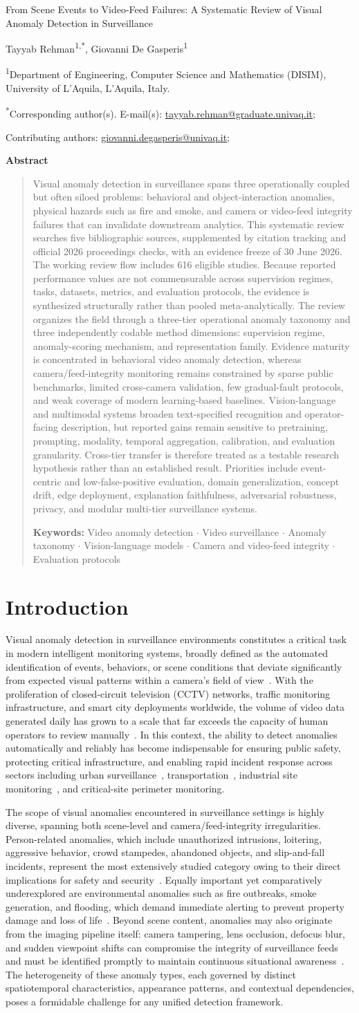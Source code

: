 \documentclass[10pt,a4paper]{article}
\makeatletter
\newif\ifprovisionalnumbers
\newcommand{\pnum}[1]{\ifprovisionalnumbers\textcolor{orange!75!black}{\textbf{#1}}\else #1\fi}
\newcommand{\articletitle}{From Scene Events to Video-Feed Failures: A Systematic Review of Visual Anomaly Detection in Surveillance}
\newcommand{\makemanuscripttitle}{%
  \thispagestyle{empty}%
  \begingroup
  \setlength{\parindent}{0pt}%
  \vspace*{0.74in}
  \begin{center}
    {\fontsize{17.28}{20.74}\selectfont \articletitle\par}
    \vspace{0.28in}
    {\fontsize{9}{11}\selectfont Tayyab Rehman\textsuperscript{1,*}, Giovanni De Gasperis\textsuperscript{1}\par}
    \vspace{0.06in}
    {\fontsize{8}{9.5}\selectfont
    \textsuperscript{1}Department of Engineering, Computer Science and Mathematics (DISIM), University of L'Aquila, L'Aquila, Italy.\par}
    \vspace{0.10in}
    {\fontsize{8}{9.5}\selectfont\textsuperscript{*}Corresponding author(s). E-mail(s): \href{mailto:tayyab.rehman@graduate.univaq.it}{tayyab.rehman@graduate.univaq.it};\par
    Contributing authors: \href{mailto:giovanni.degasperis@univaq.it}{giovanni.degasperis@univaq.it};\par}
    \vspace{0.20in}
    {\fontsize{8}{9}\selectfont\bfseries Abstract\par}
  \end{center}
  \begin{quote}\fontsize{8}{9.6}\selectfont
Visual anomaly detection in surveillance spans three operationally coupled but often siloed problems: behavioral and object-interaction anomalies, physical hazards such as fire and smoke, and camera or video-feed integrity failures that can invalidate downstream analytics. This systematic review searches five bibliographic sources, supplemented by citation tracking and official 2026 proceedings checks, with an evidence freeze of 30 June 2026. The working review flow includes \pnum{616} eligible studies. Because reported performance values are not commensurable across supervision regimes, tasks, datasets, metrics, and evaluation protocols, the evidence is synthesized structurally rather than pooled meta-analytically. The review organizes the field through a three-tier operational anomaly taxonomy and three independently codable method dimensions: supervision regime, anomaly-scoring mechanism, and representation family. Evidence maturity is concentrated in behavioral video anomaly detection, whereas camera/feed-integrity monitoring remains constrained by sparse public benchmarks, limited cross-camera validation, few gradual-fault protocols, and weak coverage of modern learning-based baselines. Vision-language and multimodal systems broaden text-specified recognition and operator-facing description, but reported gains remain sensitive to pretraining, prompting, modality, temporal aggregation, calibration, and evaluation granularity. Cross-tier transfer is therefore treated as a testable research hypothesis rather than an established result. Priorities include event-centric and low-false-positive evaluation, domain generalization, concept drift, edge deployment, explanation faithfulness, adversarial robustness, privacy, and modular multi-tier surveillance systems.

  \smallskip
  \textbf{Keywords:} Video anomaly detection \(\cdot\) Video surveillance \(\cdot\) Anomaly taxonomy \(\cdot\) Vision-language models \(\cdot\) Camera and video-feed integrity \(\cdot\) Evaluation protocols
  \end{quote}
  \ifprovisionalnumbers
  \begin{center}
  \fbox{\parbox{0.90\textwidth}{\centering\small\textbf{AUTHOR-VERIFICATION DRAFT - NOT FOR SUBMISSION YET.} PRISMA counts, agreement statistics, the three-tier allocation, and appraisal totals shown in orange are internally consistent working values. Verify them against the original search ledger and independent reviewer files, then set \texttt{\string\provisionalnumbersfalse} in the preamble.}}
  \end{center}
  \fi
  \endgroup
  \clearpage
}
\makeatother
\begin{document}
\pagestyle{empty}
\makemanuscripttitle
\pagestyle{empty}
\section{Introduction}
\label{sec:introduction}

Visual anomaly detection in surveillance environments constitutes a critical task in modern intelligent monitoring systems, broadly defined as the automated identification of events, behaviors, or scene conditions that deviate significantly from expected visual patterns within a camera's field of view~\citep{patrikar2022anomaly, nayak2021comprehensive}. With the proliferation of closed-circuit television (CCTV) networks, traffic monitoring infrastructure, and smart city deployments worldwide, the volume of video data generated daily has grown to a scale that far exceeds the capacity of human operators to review manually~\citep{sreenu2019intelligent}. In this context, the ability to detect anomalies automatically and reliably has become indispensable for ensuring public safety, protecting critical infrastructure, and enabling rapid incident response across sectors including urban surveillance~\citep{ramzan2019review}, transportation~\citep{yao2019unsupervised}, industrial site monitoring~\citep{bergmann2019mvtec}, and critical-site perimeter monitoring.

The scope of visual anomalies encountered in surveillance settings is highly diverse, spanning both scene-level and camera/feed-integrity irregularities. Person-related anomalies, which include unauthorized intrusions, loitering, aggressive behavior, crowd stampedes, abandoned objects, and slip-and-fall incidents, represent the most extensively studied category owing to their direct implications for safety and security~\citep{sultani2018real, liu2018future}. Equally important yet comparatively underexplored are environmental anomalies such as fire outbreaks, smoke generation, and flooding, which demand immediate alerting to prevent property damage and loss of life~\citep{muhammad2019efficient, chen2022fire}. Beyond scene content, anomalies may also originate from the imaging pipeline itself: camera tampering, lens occlusion, defocus blur, and sudden viewpoint shifts can compromise the integrity of surveillance feeds and must be identified promptly to maintain continuous situational awareness~\citep{mantini2019uhctd, mantini2017signal}. The heterogeneity of these anomaly types, each governed by distinct spatiotemporal characteristics, appearance patterns, and contextual dependencies, poses a formidable challenge for any unified detection framework.
\end{document}
